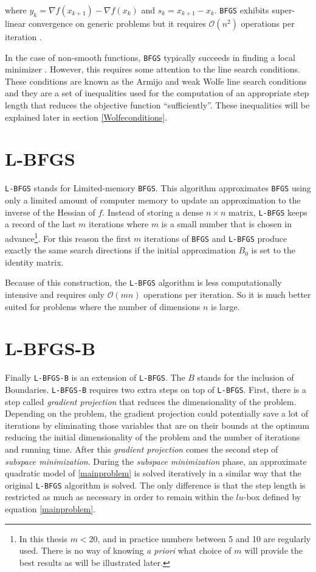 where $y_k = \nabla f(x_{k+1}) - \nabla f(x_k)$ and $s_k = x_{k+1} - x_k$.  \texttt{BFGS} exhibits super-linear convergence on generic problems but it requires $\mathcal{O}(n^2)$ operations per iteration \citep{nocedal}.

In the case of non-smooth functions, \texttt{BFGS} typically succeeds in finding a local minimizer \citep{overtonlewis}. However, this requires some attention to the line search conditions. These conditions are known as the Armijo and weak Wolfe line search conditions and they are a set of inequalities used for the computation of an appropriate step length that reduces the objective function ``sufficiently''. These inequalities will be explained later in section \ref{Wolfeconditions}.

\section{L-BFGS}

\texttt{L-BFGS} stands for Limited-memory \texttt{BFGS}. This algorithm approximates \texttt{BFGS} using only a limited amount of computer memory to update an approximation to the inverse of the Hessian of $f$. Instead of storing a dense $n \times n$ matrix, \texttt{L-BFGS} keeps a record of the last $m$ iterations where $m$ is a small number that is chosen in advance\footnote{In this thesis $m < 20$, and in practice numbers between 5 and 10 are regularly used. There is no way of knowing \emph{a priori} what choice of $m$ will provide the best results as will be illustrated later.}. For this reason the first $m$ iterations of \texttt{BFGS} and \texttt{L-BFGS} produce exactly the same search directions if the initial approximation $B_0$ is set to the identity matrix.

Because of this construction, the \texttt{L-BFGS} algorithm is less computationally intensive and requires only $\mathcal{O}(mn)$ operations per iteration. So it is much better suited for problems where the number of dimensions $n$ is large.

\section{L-BFGS-B}

Finally \texttt{L-BFGS-B} is an extension of \texttt{L-BFGS}. The $B$ stands for the inclusion of Boundaries.  \texttt{L-BFGS-B} requires two extra steps on top of \texttt{L-BFGS}. First, there is a step called \emph{gradient projection} that reduces the dimensionality of the problem. Depending on the problem, the gradient projection could potentially save a lot of iterations by eliminating those variables that are on their bounds at the optimum reducing the initial dimensionality of the problem and the number of iterations and running time. After this \emph{gradient projection} comes the second step of \emph{subspace minimization}. During the \emph{subspace minimization} phase, an approximate quadratic model of \eqref{mainproblem} is solved iteratively in a similar way that the original \texttt{L-BFGS} algorithm is solved. The only difference is that the step length is restricted as much as necessary in order to remain within the $lu$-box defined by equation \eqref{mainproblem}.

